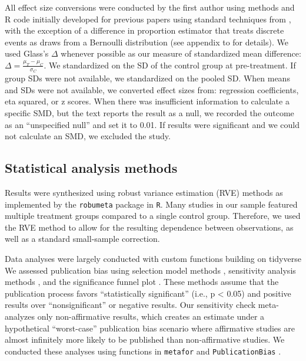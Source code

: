 \documentclass[sn-nature,referee,pdflatex]{sn-jnl}
\begin{document}
All effect size conversions were conducted by the first author using
methods and R code initially developed for previous papers
\citep{paluck2019, paluck2021, porat2024} using standard techniques from
\citep{cooper2019}, with the exception of a difference in proportion
estimator that treats discrete events as draws from a Bernoulli
distribution (see appendix to \citep{paluck2021} for details). We used
Glass's \(\Delta\) whenever possible as our measure of standardized mean
difference: \(\Delta = \frac{\mu_T - \mu_C}{\sigma_C}\). We standardized
on the SD of the control group at pre-treatment. If group SDs were not
available, we standardized on the pooled SD. When means and SDs were not
available, we converted effect sizes from: regression coefficients, eta
squared, or z scores. When there was insufficient information to
calculate a specific SMD, but the text reports the result as a null, we
recorded the outcome as an ``unspecified null'' and set it to 0.01. If
results were significant and we could not calculate an SMD, we excluded
the study.

\subsection{Statistical analysis methods}\label{sec3.4}

Results were synthesized using robust variance estimation (RVE) methods
\citep{hedges2010} as implemented by the \texttt{robumeta} package
\citep{fisher2015} in \texttt{R}\citep{Rlang}. Many studies in our
sample featured multiple treatment groups compared to a single control
group. Therefore, we used the RVE method to allow for the resulting
dependence between observations, as well as a standard small-sample
correction.

Data analyses were largely conducted with custom functions building on
tidyverse \citep{wickham2019} We assessed publication bias using
selection model methods \citep{hedges1992, vevea1995}, sensitivity
analysis methods \citep{mathur2024}, and the significance funnel plot
\citep{mathur2020}. These methods assume that the publication process
favors ``statistically significant'' (i.e., p \textless{} 0.05) and
positive results over ``nonsignificant'' or negative results. Our
sensitivity check meta-analyzes only non-affirmative results, which
creates an estimate under a hypothetical ``worst-case'' publication bias
scenario where affirmative studies are almost infinitely more likely to
be published than non-affirmative studies. We conducted these analyses
using functions in \texttt{metafor} \citep{viechtbauer2010} and
\texttt{PublicationBias} \citep{mathur2020, mathur2024}.
\end{document}
